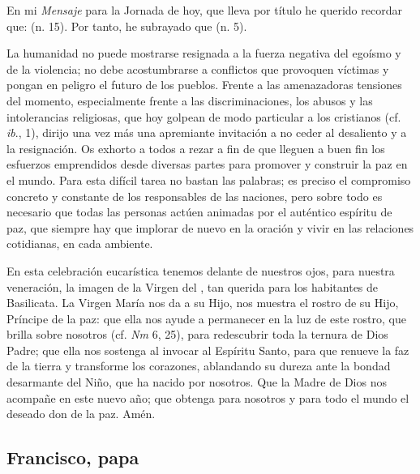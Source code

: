 {En mi \emph{Mensaje} para la Jornada de hoy, que lleva por título  he querido recordar que:  (n. 15). Por tanto, he subrayado que  (n. 5).

La humanidad no puede mostrarse resignada a la fuerza negativa del egoísmo y de la violencia; no debe acostumbrarse a conflictos que provoquen víctimas y pongan en peligro el futuro de los pueblos. Frente a las amenazadoras tensiones del momento, especialmente frente a las discriminaciones, los abusos y las intolerancias religiosas, que hoy golpean de modo particular a los cristianos (cf. \emph{ib}., 1), dirijo una vez más una apremiante invitación a no ceder al desaliento y a la resignación. Os exhorto a todos a rezar a fin de que lleguen a buen fin los esfuerzos emprendidos desde diversas partes para promover y construir la paz en el mundo. Para esta difícil tarea no bastan las palabras; es preciso el compromiso concreto y constante de los responsables de las naciones, pero sobre todo es necesario que todas las personas actúen animadas por el auténtico espíritu de paz, que siempre hay que implorar de nuevo en la oración y vivir en las relaciones cotidianas, en cada ambiente.

En esta celebración eucarística tenemos delante de nuestros ojos, para nuestra veneración, la imagen de la Virgen del , tan querida para los habitantes de Basilicata. La Virgen María nos da a su Hijo, nos muestra el rostro de su Hijo, Príncipe de la paz: que ella nos ayude a permanecer en la luz de este rostro, que brilla sobre nosotros (cf. \emph{Nm} 6, 25), para redescubrir toda la ternura de Dios Padre; que ella nos sostenga al invocar al Espíritu Santo, para que renueve la faz de la tierra y transforme los corazones, ablandando su dureza ante la bondad desarmante del Niño, que ha nacido por nosotros. Que la Madre de Dios nos acompañe en este nuevo año; que obtenga para nosotros y para todo el mundo el deseado don de la paz. Amén.


\subsection{Francisco, papa}





}
